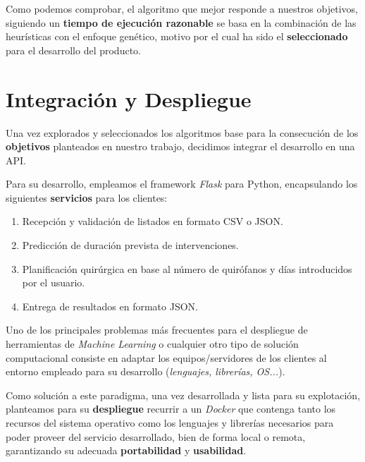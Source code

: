  Como podemos comprobar, el algoritmo que mejor responde a nuestros objetivos, siguiendo un \textbf{tiempo de ejecución razonable} se basa en la combinación de las heurísticas con el enfoque genético, motivo por el cual ha sido el \textbf{seleccionado} para el desarrollo del producto.


 \newpage

 \section{Integración y Despliegue}

 Una vez explorados y seleccionados los algoritmos base para la consecución de los \textbf{objetivos} planteados en nuestro trabajo, decidimos integrar el desarrollo en una API.

 Para su desarrollo, empleamos el framework \textit{Flask}\cite{Grinberg2018FlaskPython} para Python, encapsulando los siguientes \textbf{servicios} para los clientes:
 
 \begin{enumerate}
     \item Recepción y validación de listados en formato CSV o JSON.
     \item Predicción de duración prevista de intervenciones.
     \item Planificación quirúrgica en base al número de quirófanos y días introducidos por el usuario.
     \item Entrega de resultados en formato JSON.
 \end{enumerate}

Uno de los principales problemas más frecuentes para el despliegue de herramientas de \textit{Machine Learning} o cualquier otro tipo de solución computacional consiste en adaptar los equipos/servidores de los clientes al entorno empleado para su desarrollo (\textit{lenguajes, librerías, OS...}). 

Como solución a este paradigma, una vez desarrollada y lista para su explotación, planteamos para su \textbf{despliegue} recurrir a un \textit{Docker}\cite{Merkel2014Docker:Deployment} que contenga tanto los recursos del sistema operativo como los lenguajes y librerías necesarios para poder proveer del servicio desarrollado, bien de forma local o remota, garantizando su adecuada \textbf{portabilidad} y \textbf{usabilidad}.

